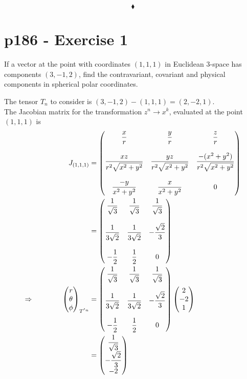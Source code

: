 $$\blacklozenge$$
\newpage

\section{p186 - Exercise 1}
\begin{tcolorbox}
If a vector at the point with coordinates $\left(1,1,1\right)$ in Euclidean $3$-space has components $\left(3,-1,2\right)$, find the contravariant, covariant and physical components in spherical polar coordinates.
\end{tcolorbox}
The tensor $T_n$ to consider is $\left(3,-1,2\right) - \left(1,1,1\right)= \left(2,-2,1\right)$.\\
The Jacobian matrix for the transformation $z^n \rightarrow x^k$, evaluated at the point $\left(1,1,1\right)$ is 
\begin{align}
J_{\left(1,1,1\right)}&={\begin{pmatrix}{\dfrac {x}{r}}&{\dfrac {y}{r}}&{\dfrac {z}{r}}\\\\{\dfrac {xz}{r^{2}{\sqrt {x^{2}+y^{2}}}}}&{\dfrac {yz}{r^{2}{\sqrt {x^{2}+y^{2}}}}}&{\dfrac {-(x^{2}+y^{2})}{r^{2}{\sqrt {x^{2}+y^{2}}}}}\\\\{\dfrac {-y}{x^{2}+y^{2}}}&{\dfrac {x}{x^{2}+y^{2}}}&0\end{pmatrix}}\\
&=\begin{pmatrix}\dfrac {1}{\sqrt{3}}&\dfrac {1}{\sqrt{3}}&\dfrac {1}{\sqrt{3}}\\\\ \dfrac {1}{3\sqrt{2}}& \dfrac {1}{3\sqrt{2}}&-\dfrac {\sqrt{2}}{3}\\\\ -\dfrac {1}{2}&\dfrac {1}{2}&0\end{pmatrix}\\
\Rightarrow \quad\quad\quad\quad 
\begin{pmatrix}
r\\
\theta\\
\phi
\end{pmatrix}_{T^{'n}}&=\begin{pmatrix}\dfrac {1}{\sqrt{3}}&\dfrac {1}{\sqrt{3}}&\dfrac {1}{\sqrt{3}}\\\\ \dfrac {1}{3\sqrt{2}}& \dfrac {1}{3\sqrt{2}}&-\dfrac {\sqrt{2}}{3}\\\\ -\dfrac {1}{2}&\dfrac {1}{2}&0\end{pmatrix}\begin{pmatrix}
2\\
-2\\
1
\end{pmatrix}\\
&=\begin{pmatrix}
\dfrac {1}{\sqrt{3}}\\
-\dfrac {\sqrt{2}}{3}\\
-2
\end{pmatrix}
\end{align}
